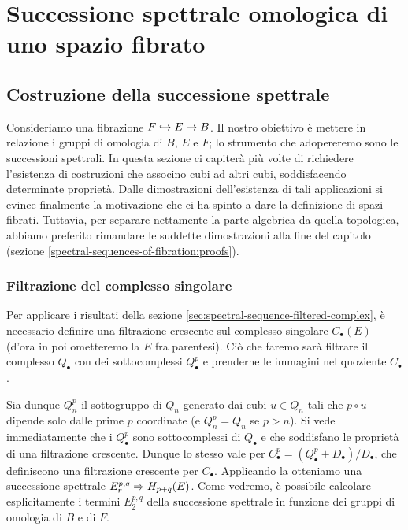 \chapter{Successione spettrale omologica di uno spazio fibrato}

\section{Costruzione della successione spettrale}
Consideriamo una fibrazione $F\hookrightarrow E\to B$. Il nostro obiettivo è mettere in relazione i gruppi di omologia di $B$, $E$ e $F$; lo strumento che adopereremo sono le successioni spettrali. In questa sezione ci capiterà più volte di richiedere l'esistenza di costruzioni che associno cubi ad altri cubi, soddisfacendo determinate proprietà. Dalle dimostrazioni dell'esistenza di tali applicazioni si evince finalmente la motivazione che ci ha spinto a dare la definizione di spazi fibrati. Tuttavia, per separare nettamente la parte algebrica da quella topologica, abbiamo preferito rimandare le suddette dimostrazioni alla fine del capitolo (sezione \ref{spectral-sequences-of-fibration:proofs}).

\subsection{Filtrazione del complesso singolare}
Per applicare i risultati della sezione \ref{sec:spectral-sequence-filtered-complex}, è necessario definire una filtrazione crescente sul complesso singolare $C_\bullet(E)$ (d'ora in poi ometteremo la $E$ fra parentesi). Ciò che faremo sarà filtrare il complesso $Q_\bullet$ con dei sottocomplessi $Q^p_\bullet$ e prenderne le immagini nel quoziente $C_\bullet$.

Sia dunque $Q^p_n$ il sottogruppo di $Q_n$ generato dai cubi $u\in Q_n$ tali che $p\circ u$ dipende solo dalle prime $p$ coordinate (e $Q^p_n=Q_n$ se $p>n$). Si vede immediatamente che i $Q^p_\bullet$ sono sottocomplessi di $Q_\bullet$ e che soddisfano le proprietà di una filtrazione crescente. Dunque lo stesso vale per $C^p_\bullet=(Q^p_\bullet+D_\bullet)/D_\bullet$, che definiscono una filtrazione crescente per $C_\bullet$. Applicando la  otteniamo una successione spettrale $E^{p,q}_r\Rightarrow H_{p+q}(E)$. Come vedremo, è possibile calcolare esplicitamente i termini $E^{p,q}_2$ della successione spettrale in funzione dei gruppi di omologia di $B$ e di $F$.

